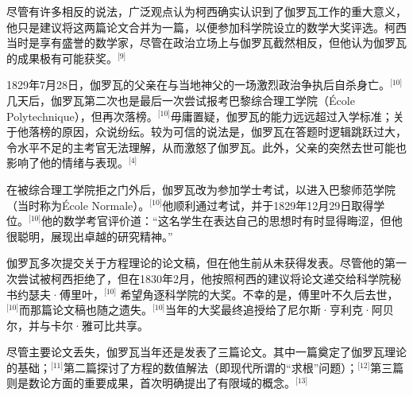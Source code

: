 尽管有许多相反的说法，广泛观点认为柯西确实认识到了伽罗瓦工作的重大意义，他只是建议将这两篇论文合并为一篇，以便参加科学院设立的数学大奖评选。柯西当时是享有盛誉的数学家，尽管在政治立场上与伽罗瓦截然相反，但他认为伽罗瓦的成果极有可能获奖。\(^\text{[9]}\)

1829年7月28日，伽罗瓦的父亲在与当地神父的一场激烈政治争执后自杀身亡。\(^\text{[10]}\)几天后，伽罗瓦第二次也是最后一次尝试报考巴黎综合理工学院（École Polytechnique），但再次落榜。\(^\text{[10]}\)毋庸置疑，伽罗瓦的能力远远超过入学标准；关于他落榜的原因，众说纷纭。较为可信的说法是，伽罗瓦在答题时逻辑跳跃过大，令水平不足的主考官无法理解，从而激怒了伽罗瓦。此外，父亲的突然去世可能也影响了他的情绪与表现。\(^\text{[4]}\)

在被综合理工学院拒之门外后，伽罗瓦改为参加学士考试，以进入巴黎师范学院（当时称为École Normale）。\(^\text{[10]}\)他顺利通过考试，并于1829年12月29日取得学位。\(^\text{[10]}\)他的数学考官评价道：“这名学生在表达自己的思想时有时显得晦涩，但他很聪明，展现出卓越的研究精神。”

伽罗瓦多次提交关于方程理论的论文稿，但在他生前从未获得发表。尽管他的第一次尝试被柯西拒绝了，但在1830年2月，他按照柯西的建议将论文递交给科学院秘书约瑟夫·傅里叶，\(^\text{[10]}\) 希望角逐科学院的大奖。不幸的是，傅里叶不久后去世，\(^\text{[10]}\)而那篇论文稿也随之遗失。\(^\text{[10]}\)当年的大奖最终追授给了尼尔斯·亨利克·阿贝尔，并与卡尔·雅可比共享。

尽管主要论文丢失，伽罗瓦当年还是发表了三篇论文。其中一篇奠定了伽罗瓦理论的基础；\(^\text{[11]}\)第二篇探讨了方程的数值解法（即现代所谓的“求根”问题）；\(^\text{[12]}\)第三篇则是数论方面的重要成果，首次明确提出了有限域的概念。\(^\text{[13]}\)
